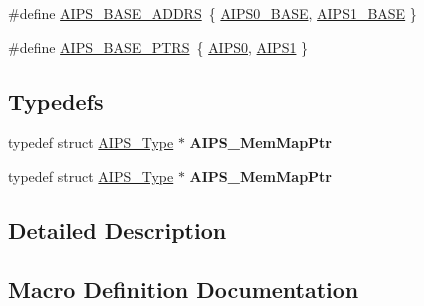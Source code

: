 \begin{DoxyCompactItemize}
\item 
\#define \hyperlink{group__AIPS__Peripheral__Access__Layer_ga8aa4e4d4ece25fca4cf74a31f58951ec}{A\+I\+P\+S\+\_\+\+B\+A\+S\+E\+\_\+\+A\+D\+D\+RS}~\{ \hyperlink{group__AIPS__Peripheral__Access__Layer_ga0162f7b0dfde801ad0aec6b77bf9d568}{A\+I\+P\+S0\+\_\+\+B\+A\+SE}, \hyperlink{group__AIPS__Peripheral__Access__Layer_gaffd389fb1382348a01812983d3f719eb}{A\+I\+P\+S1\+\_\+\+B\+A\+SE} \}
\item 
\#define \hyperlink{group__AIPS__Peripheral__Access__Layer_gacdda032ccd174e1d8c1a02b1e0f7a441}{A\+I\+P\+S\+\_\+\+B\+A\+S\+E\+\_\+\+P\+T\+RS}~\{ \hyperlink{group__AIPS__Peripheral__Access__Layer_gadd0f01794c41f63593cc12e3e6005a95}{A\+I\+P\+S0}, \hyperlink{group__AIPS__Peripheral__Access__Layer_gaf3762b87e8cec88184bb576217fbcee8}{A\+I\+P\+S1} \}
\end{DoxyCompactItemize}
\subsection*{Typedefs}
\begin{DoxyCompactItemize}
\item 
typedef struct \hyperlink{structAIPS__Type}{A\+I\+P\+S\+\_\+\+Type} $\ast$ {\bfseries A\+I\+P\+S\+\_\+\+Mem\+Map\+Ptr}\hypertarget{group__AIPS__Peripheral__Access__Layer_ga87c70c8b8ae4bd5c488bd1e36989719c}{}\label{group__AIPS__Peripheral__Access__Layer_ga87c70c8b8ae4bd5c488bd1e36989719c}

\item 
typedef struct \hyperlink{structAIPS__Type}{A\+I\+P\+S\+\_\+\+Type} $\ast$ {\bfseries A\+I\+P\+S\+\_\+\+Mem\+Map\+Ptr}\hypertarget{group__AIPS__Peripheral__Access__Layer_ga87c70c8b8ae4bd5c488bd1e36989719c}{}\label{group__AIPS__Peripheral__Access__Layer_ga87c70c8b8ae4bd5c488bd1e36989719c}

\end{DoxyCompactItemize}


\subsection{Detailed Description}


\subsection{Macro Definition Documentation}

